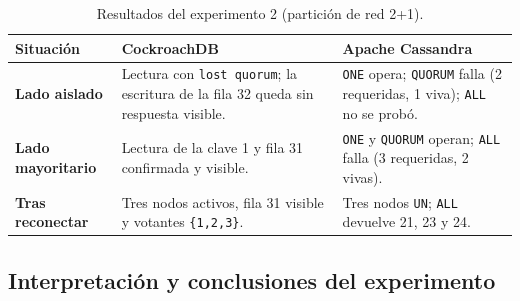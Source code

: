 \documentclass[11pt,a4paper]{article}
\newcommand{\sistemaA}{CockroachDB}      %
\newcommand{\sistemaB}{Apache Cassandra} %
\begin{document}
\begin{table}[H]
  \centering
  \caption{Resultados del experimento 2 (partición de red 2+1).}
  \label{tab:e2}
  \scriptsize
  \begin{tabularx}{\textwidth}{@{}>{\bfseries}p{3.0cm}XX@{}}
    \toprule
    Situación & \sistemaA & \sistemaB \\
    \midrule
    Lado aislado & Lectura con \texttt{lost quorum}; la escritura de la fila 32 queda
    sin respuesta visible. & \texttt{ONE} opera; \texttt{QUORUM} falla (2 requeridas,
    1 viva); \texttt{ALL} no se probó. \\
    Lado mayoritario & Lectura de la clave 1 y fila 31 confirmada y visible. &
    \texttt{ONE} y \texttt{QUORUM} operan; \texttt{ALL} falla (3 requeridas,
    2 vivas). \\
    Tras reconectar & Tres nodos activos, fila 31 visible y votantes
    \texttt{\{1,2,3\}}. & Tres nodos \texttt{UN}; \texttt{ALL} devuelve 21, 23 y 24. \\
    \bottomrule
  \end{tabularx}
\end{table}

\subsection{Interpretación y conclusiones del experimento}
\end{document}
